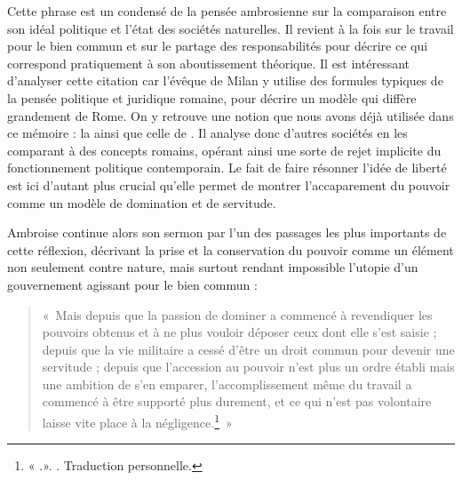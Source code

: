 Cette phrase est un condensé de la pensée ambrosienne sur la comparaison entre son idéal politique et l'état des sociétés naturelles. Il revient à la fois sur le travail pour le bien commun et sur le partage des responsabilités pour décrire ce qui correspond pratiquement à son aboutissement théorique. Il est intéressant d'analyser cette citation car l'évêque de Milan y utilise des formules typiques de la pensée politique et juridique romaine, pour décrire un modèle qui diffère grandement de Rome. On y retrouve une notion que nous avons déjà utilisée dans ce mémoire : la  ainsi que celle de . Il analyse donc d'autres sociétés en les comparant à des concepts romains, opérant ainsi une sorte de rejet implicite du fonctionnement politique contemporain. Le fait de faire résonner l'idée de liberté est ici d'autant plus crucial qu'elle permet de montrer l'accaparement du pouvoir comme un modèle de domination et de servitude.

\bigskip

Ambroise continue alors son sermon par l'un des passages les plus importants de cette réflexion, décrivant la prise et la conservation du pouvoir comme un élément non seulement contre nature, mais surtout rendant impossible l'utopie d'un gouvernement agissant pour le bien commun :

\bigskip

\begin{quote}
    «~Mais depuis que la passion de dominer a commencé à revendiquer les pouvoirs obtenus et à ne plus vouloir déposer ceux dont elle s'est saisie ; depuis que la vie militaire a cessé d'être un droit commun pour devenir une servitude ; depuis que l'accession au pouvoir n'est plus un ordre établi mais une ambition de s'en emparer, l'accomplissement même du travail a commencé à être supporté plus durement, et ce qui n'est pas volontaire laisse vite place à la négligence.\footnote{« .». \cite[\nopp V, 15, 52]{ambroise_csel_32_1}. Traduction personnelle.}~»
\end{quote}

\bigskip

